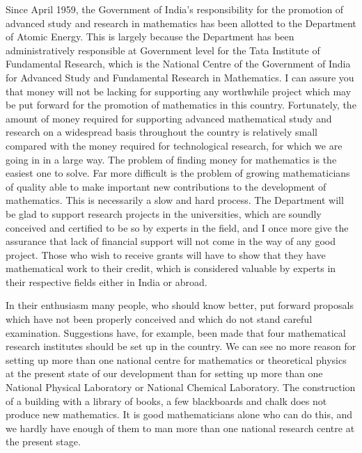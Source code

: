Since April 1959, the Government of India's responsibility for the
promotion of advanced study and research in mathematics has been
allotted to the Department of Atomic Energy. This is largely because
the Department has been administratively responsible at Government
level for the Tata Institute of Fundamental Research, which is the
National Centre of the Government of India for Advanced Study and
Fundamental Research in Mathematics. I can assure you that money will
not be lacking for supporting any worthwhile project which may be put
forward for the promotion of mathematics in this country. Fortunately,
the amount of money required for supporting advanced mathematical
study and research on a widespread basis throughout the country is
relatively small compared with the money required for technological
research, for which we are going in in a large way. The problem of
finding money for mathematics is the easiest one to solve. Far more
difficult is the problem of growing mathematicians of quality able to
make important new contributions to the development of
mathematics. This is necessarily a slow and hard process. The
Department will be glad to support research projects in the
universities, which are soundly conceived and certified to be so by
experts in the field, and I once more give the assurance that lack of
financial support will not come in the way of any good project. Those
who wish to receive grants will have to show that they have
mathematical work to their credit, which is considered valuable by
experts in their respective fields either in India or abroad.

In their enthusiasm many people, who should know better, put forward
proposals which have not been properly conceived and which do not
stand careful examination. Suggestions have, for example, been made
that four mathematical research institutes should be set up in the
country. We can see no more reason for setting up more than one
national centre for mathematics or theoretical physics at the present
state of our development than for setting up more than one National
Physical Laboratory or National Chemical Laboratory. The construction
of a building with a library of books, a few blackboards and chalk
does not produce new mathematics. It is good mathematicians alone who
can do this, and we hardly have enough of them to man more than one
national research centre at the present stage.

